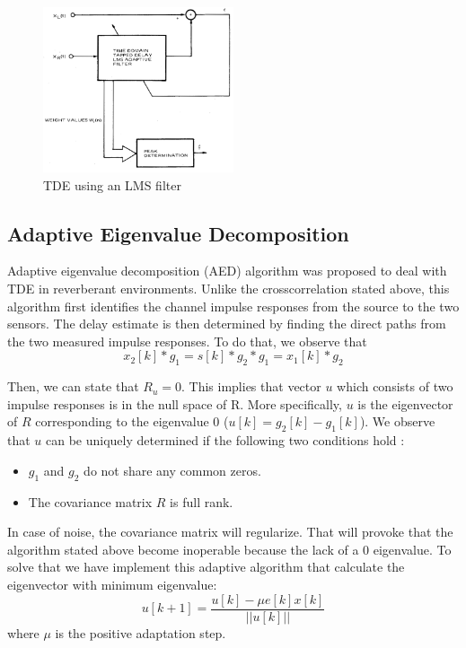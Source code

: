 \begin{figure}[htb]
	\begin{center}
		\includegraphics[width=0.5\textwidth]{figures/LMS.png}
	\end{center}
	\caption{TDE using an LMS filter}
	\label{fig:LMS}
\end{figure}


\subsection{Adaptive Eigenvalue Decomposition}
Adaptive eigenvalue decomposition (AED) algorithm was proposed to deal with TDE in reverberant environments. Unlike the crosscorrelation stated above, this algorithm first identifies the channel impulse responses from the source to the two sensors. The delay estimate is then determined by finding the direct paths from the two measured impulse responses. To do that, we observe that
\begin{dmath}
  x_2[k] * g_1 = s[k] * g_2 * g_1 = x_1[k] * g_2
\end{dmath}
  
  Then, we can state that $R_u = 0$. This implies that vector $u$ which consists of two impulse responses is in the null space of R. More specifically, $u$ is the eigenvector of $R$ corresponding to the eigenvalue 0 ($u[k]=g_2[k] - g_1[k]$). We observe that $u$ can be uniquely determined if the following two conditions hold \cite{overview, aed}:
\begin{itemize}
  \item $g_1$ and $g_2$ do not share any common zeros.
  \item The covariance matrix $R$ is full rank.
\end{itemize}

  In case of noise, the covariance matrix will regularize. That will provoke that the algorithm stated above become inoperable because the lack of a 0 eigenvalue. To solve that we have implement this adaptive algorithm that calculate the eigenvector with minimum eigenvalue:
 \begin{dmath}
    u[k+1] = \frac{u[k] - \mu e[k] x[k]}{||u[k]||}
 \end{dmath}
 where $\mu$ is the positive adaptation step.
 

